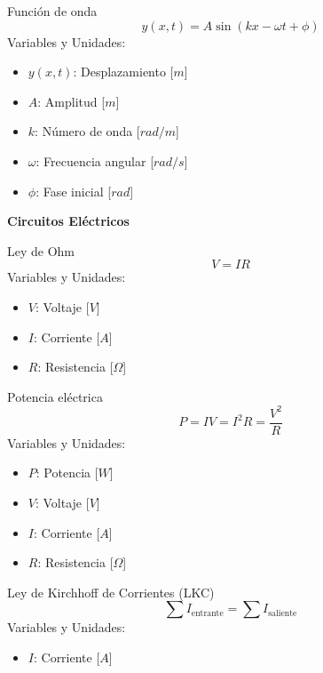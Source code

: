 \begin{landscape}
\begin{multicols}{3}
\begin{teorema}{Función de onda}
    $$y(x,t) = A \sin(kx - \omega t + \phi)$$
    Variables y Unidades:
    \begin{itemize}
        \item $y(x,t)$: Desplazamiento [$m$]
        \item $A$: Amplitud [$m$]
        \item $k$: Número de onda [$rad/m$]
        \item $\omega$: Frecuencia angular [$rad/s$]
        \item $\phi$: Fase inicial [$rad$]
    \end{itemize}
\end{teorema}

\end{multicols}

\newpage

\begin{center}
    \LARGE \textbf{Circuitos Eléctricos}
\end{center}

\begin{multicols}{3}

\begin{teorema}{Ley de Ohm}
    $$V = I R$$
    Variables y Unidades:
    \begin{itemize}
        \item $V$: Voltaje [$V$]
        \item $I$: Corriente [$A$]
        \item $R$: Resistencia [$\Omega$]
    \end{itemize}
\end{teorema}

\begin{teorema}{Potencia eléctrica}
    $$P = I V = I^2 R = \frac{V^2}{R}$$
    Variables y Unidades:
    \begin{itemize}
        \item $P$: Potencia [$W$]
        \item $V$: Voltaje [$V$]
        \item $I$: Corriente [$A$]
        \item $R$: Resistencia [$\Omega$]
    \end{itemize}
\end{teorema}

\columnbreak

\begin{teorema}{Ley de Kirchhoff de Corrientes (LKC)}
    $$\sum I_{\text{entrante}} = \sum I_{\text{saliente}}$$
    Variables y Unidades:
    \begin{itemize}
        \item $I$: Corriente [$A$]
    \end{itemize}
\end{teorema}


\end{multicols}
\end{landscape}
